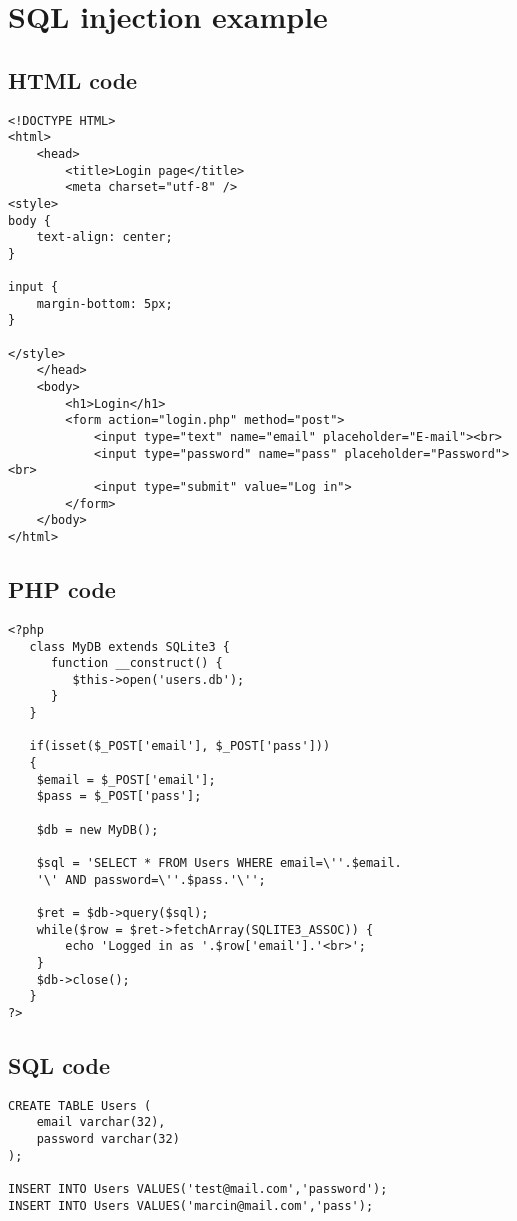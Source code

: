 \documentclass[a4paper]{article}
\begin{document}
\newpage

\printbibliography
{}

\newpage

\appendix
\section{SQL injection example}

\subsection{HTML code}
\begin{verbatim}
<!DOCTYPE HTML>
<html>
	<head>
		<title>Login page</title>
		<meta charset="utf-8" />
<style>
body {
	text-align: center;
}

input {
	margin-bottom: 5px;
}

</style>
	</head>
	<body>
		<h1>Login</h1>
		<form action="login.php" method="post">
			<input type="text" name="email" placeholder="E-mail"><br>
			<input type="password" name="pass" placeholder="Password"><br>
			<input type="submit" value="Log in">
		</form>
	</body>
</html>
\end{verbatim}
\newpage

\subsection{PHP code}
\begin{verbatim}
<?php
   class MyDB extends SQLite3 {
      function __construct() {
         $this->open('users.db');
      }
   }

   if(isset($_POST['email'], $_POST['pass']))
   {
	$email = $_POST['email'];
	$pass = $_POST['pass'];

	$db = new MyDB();

	$sql = 'SELECT * FROM Users WHERE email=\''.$email.
    '\' AND password=\''.$pass.'\'';

	$ret = $db->query($sql);
	while($row = $ret->fetchArray(SQLITE3_ASSOC)) {
		echo 'Logged in as '.$row['email'].'<br>';
	}
	$db->close();
   }
?>
\end{verbatim}
\newpage

\subsection{SQL code}
\begin{verbatim}
CREATE TABLE Users (
	email varchar(32),
	password varchar(32)
);

INSERT INTO Users VALUES('test@mail.com','password');
INSERT INTO Users VALUES('marcin@mail.com','pass');
\end{verbatim}
\newpage
\end{document}
